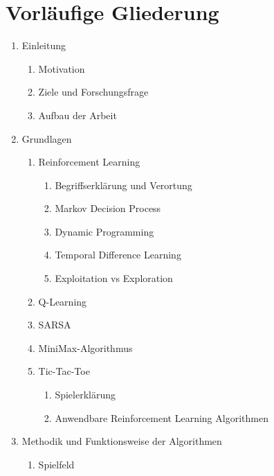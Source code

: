 \section*{Vorläufige Gliederung}
\renewcommand{\labelenumii}{\arabic{enumi}.\arabic{enumii}}
\renewcommand{\labelenumiii}{\arabic{enumi}.\arabic{enumii}.\arabic{enumiii}}
\begin{enumerate}
    \item Einleitung
        \begin{enumerate}
        \item Motivation
        \item Ziele und Forschungsfrage
        \item Aufbau der Arbeit
        \end{enumerate}
    \item Grundlagen
        \begin{enumerate}
        \item Reinforcement Learning
            \begin{enumerate}
            \item Begriffserklärung und Verortung
            \item Markov Decision Process
            \item Dynamic Programming
            \item Temporal Difference Learning
            \item Exploitation vs Exploration
            \end{enumerate}
        \item Q-Learning
        \item SARSA      
        \item MiniMax-Algorithmus
        \item Tic-Tac-Toe
            \begin{enumerate}
            \item Spielerklärung
            \item Anwendbare Reinforcement Learning Algorithmen
            \end{enumerate}
        \end{enumerate}
    \item Methodik und Funktionsweise der Algorithmen
        \begin{enumerate}
        \item Spielfeld

\end{enumerate}
\end{enumerate}

